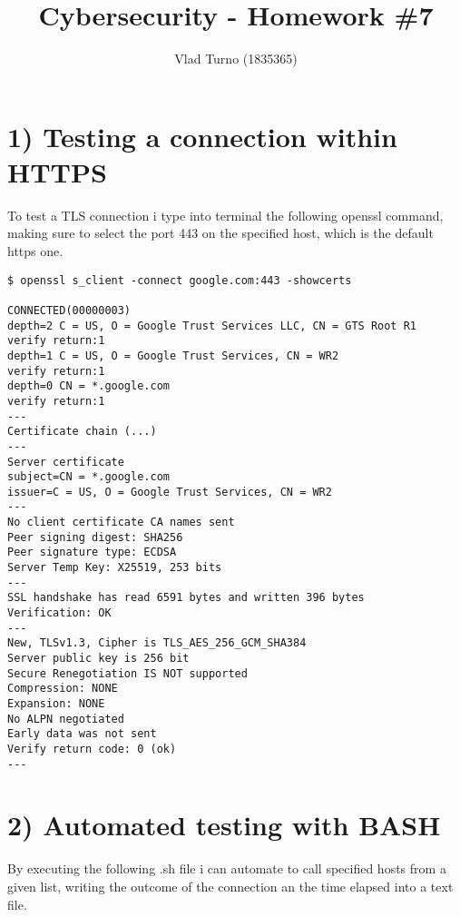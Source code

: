 \documentclass{article}
\title{Cybersecurity - Homework \#7}
\author{Vlad Turno (1835365)}
\begin{document}
\maketitle

\section*{1) Testing a connection within HTTPS}
To test a TLS connection i type into terminal the following openssl command, making sure to select the port 443 on the specified host, which is the default https one.\\

\begin{verbatim}
$ openssl s_client -connect google.com:443 -showcerts

CONNECTED(00000003)
depth=2 C = US, O = Google Trust Services LLC, CN = GTS Root R1
verify return:1
depth=1 C = US, O = Google Trust Services, CN = WR2
verify return:1
depth=0 CN = *.google.com
verify return:1
---
Certificate chain (...)
---
Server certificate
subject=CN = *.google.com
issuer=C = US, O = Google Trust Services, CN = WR2
---
No client certificate CA names sent
Peer signing digest: SHA256
Peer signature type: ECDSA
Server Temp Key: X25519, 253 bits
---
SSL handshake has read 6591 bytes and written 396 bytes
Verification: OK
---
New, TLSv1.3, Cipher is TLS_AES_256_GCM_SHA384
Server public key is 256 bit
Secure Renegotiation IS NOT supported
Compression: NONE
Expansion: NONE
No ALPN negotiated
Early data was not sent
Verify return code: 0 (ok)
---
\end{verbatim}

\section*{2) Automated testing with BASH}
By executing the following .sh file i can automate to call specified hosts from a given list, writing the outcome of the connection an the time elapsed into a text file.
\\


\end{document}
